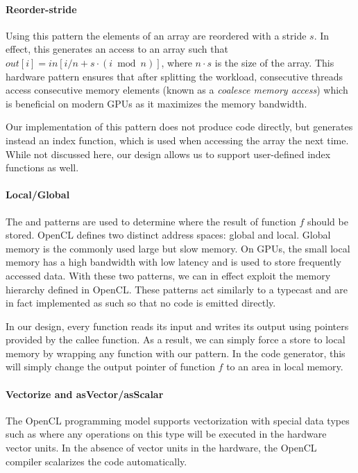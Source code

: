 \paragraph{Reorder-stride}
Using this pattern the elements of an array are reordered with a stride $s$.
In effect, this generates an access to an array such that $out[i] = in[i / n + s \cdot (i \bmod{n})]$, where $n\cdot s$ is the size of the array.
This hardware pattern ensures that after splitting the workload, consecutive threads access consecutive memory elements (known as a \emph{coalesce memory access}) which is beneficial on modern GPUs as it maximizes the memory bandwidth.

Our implementation of this pattern does not produce code directly, but generates instead an index function, which is used when accessing the array the next time.
While not discussed here, our design allows us to support user-defined index functions as well.

\paragraph{Local/Global}
The  and  patterns are used to determine where the result of function $f$ should be stored.
OpenCL defines two distinct address spaces: global and local.
Global memory is the commonly used large but slow memory.
On GPUs, the small local memory has a high bandwidth with low latency and is used to store frequently accessed data.
With these two patterns, we can in effect exploit the memory hierarchy defined in OpenCL.
These patterns act similarly to a typecast and are in fact implemented as such so that no code is emitted directly.

In our design, every function reads its input and writes its output using pointers provided by the callee function.
As a result, we can simply force a store to local memory by wrapping any function with our  pattern.
In the code generator, this will simply change the output pointer of function $f$ to an area in local memory.

\paragraph{Vectorize and asVector/asScalar}
The OpenCL programming model supports vectorization with special data types such as  where any operations on this type will be executed in the hardware vector units.
In the absence of vector units in the hardware, the OpenCL compiler scalarizes the code automatically.

